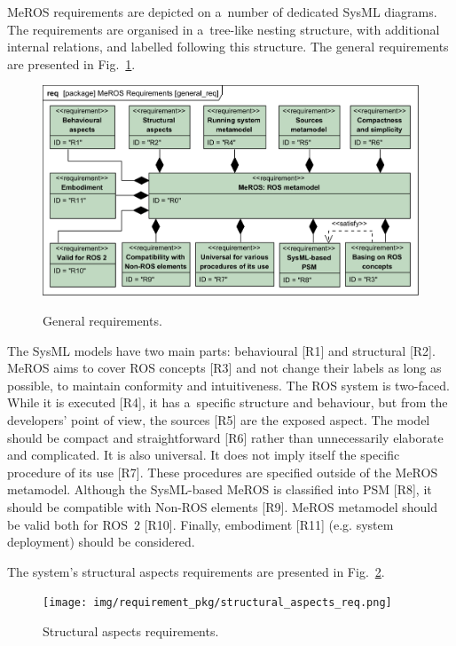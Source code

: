 \documentclass[11pt,oneside,a4paper]{report}
\begin{document}
	MeROS requirements are depicted on a~number of dedicated SysML diagrams. The requirements are organised in a~tree-like nesting structure, with additional internal relations, and labelled following this structure. The general requirements are presented in Fig.~\ref{fig:general_req}. 
		
	\begin{figure}[H]
		\centering
		\begin{center}
			{\includegraphics[scale=1.0]{diagrams/general_req.png}}
		\end{center}
		\caption{General requirements.} 
		\label{fig:general_req}
	\end{figure}
		
	The SysML models have two main parts: behavioural [R1] and structural [R2]. MeROS aims to cover ROS concepts [R3] and not change their labels as long as possible, to maintain conformity and intuitiveness. The ROS system is two-faced. While it is executed [R4], it has a~specific structure and behaviour, but from the developers' point of view, the sources [R5] are the exposed aspect. The model should be compact and straightforward [R6] rather than unnecessarily elaborate and complicated. It is also universal. It does not imply itself the specific procedure of its use [R7]. These procedures are specified outside of the MeROS metamodel. Although the SysML-based MeROS is classified into PSM [R8], it should be compatible with Non-ROS elements [R9]. MeROS metamodel should be valid both for ROS~2 [R10]. Finally, embodiment [R11] (e.g. system deployment) should be considered.
	
	The system's structural aspects requirements are presented in Fig.~\ref{fig:structural_aspects_req}.
	
	\begin{figure}[H]
		\centering
		\begin{center}
			{\texttt{[image: img/requirement\_pkg/structural\_aspects\_req.png]}}
		\end{center}
		\caption{Structural aspects requirements.} 
		\label{fig:structural_aspects_req}
	\end{figure}
	
\end{document}
